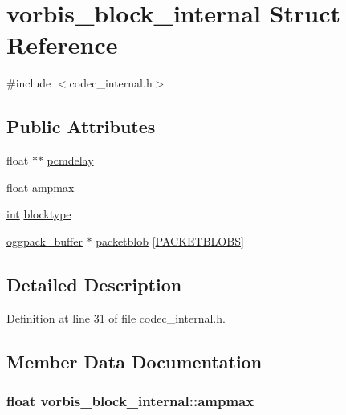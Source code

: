\hypertarget{structvorbis__block__internal}{}\section{vorbis\+\_\+block\+\_\+internal Struct Reference}
\label{structvorbis__block__internal}


{\ttfamily \#include $<$codec\+\_\+internal.\+h$>$}

\subsection*{Public Attributes}
\begin{DoxyCompactItemize}
\item 
float $\ast$$\ast$ \hyperlink{structvorbis__block__internal_a6a650f039d0b3c0b320c8bf5e198547a}{pcmdelay}
\item 
float \hyperlink{structvorbis__block__internal_ad06b07115317a4928f8807c61a903da9}{ampmax}
\item 
\hyperlink{xmltok_8h_a5a0d4a5641ce434f1d23533f2b2e6653}{int} \hyperlink{structvorbis__block__internal_a4e3ca80a917072fbbe17dd5bd23f96ed}{blocktype}
\item 
\hyperlink{structoggpack__buffer}{oggpack\+\_\+buffer} $\ast$ \hyperlink{structvorbis__block__internal_a7b98d48f2d7a3305005d0513a7698218}{packetblob} \mbox{[}\hyperlink{codec__internal_8h_a9293c5a15a78abadbe212d944080e04b}{P\+A\+C\+K\+E\+T\+B\+L\+O\+BS}\mbox{]}
\end{DoxyCompactItemize}


\subsection{Detailed Description}


Definition at line 31 of file codec\+\_\+internal.\+h.



\subsection{Member Data Documentation}
\subsubsection[{\texorpdfstring{ampmax}{ampmax}}]{\setlength{\rightskip}{0pt plus 5cm}float vorbis\+\_\+block\+\_\+internal\+::ampmax}\hypertarget{structvorbis__block__internal_ad06b07115317a4928f8807c61a903da9}{}\label{structvorbis__block__internal_ad06b07115317a4928f8807c61a903da9}


